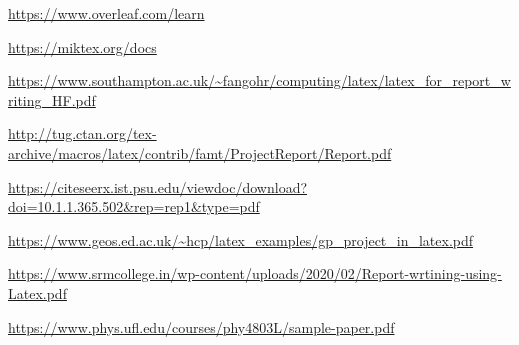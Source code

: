 

\begin{thebibliography}{99}
	
	
	
	
	 \url{https://www.overleaf.com/learn}
	
	 \url{https://miktex.org/docs}
	
	 \url{https://www.southampton.ac.uk/~fangohr/computing/latex/latex_for_report_writing_HF.pdf}
	
	\url{http://tug.ctan.org/tex-archive/macros/latex/contrib/famt/ProjectReport/Report.pdf}
	
	\url{https://citeseerx.ist.psu.edu/viewdoc/download?doi=10.1.1.365.502&rep=rep1&type=pdf}
	
	\url{https://www.geos.ed.ac.uk/~hcp/latex_examples/gp_project_in_latex.pdf}
	
	\url{https://www.srmcollege.in/wp-content/uploads/2020/02/Report-wrtining-using-Latex.pdf}
	
	\url{https://www.phys.ufl.edu/courses/phy4803L/sample-paper.pdf}
	
\end{thebibliography}